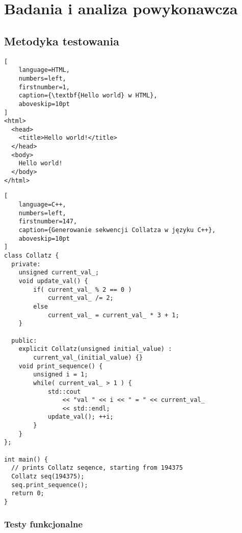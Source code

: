 \part{Badania i analiza powykonawcza}
\noindent \lipsum[1-5]

\clearpage\chapter{Metodyka testowania}
\noindent \lipsum[6-8]

\begin{addmargin}[8mm]{0mm}
\begin{lstlisting}[
    language=HTML,
    numbers=left,
    firstnumber=1,
    caption={\textbf{Hello world} w HTML},
    aboveskip=10pt
]
<html>
  <head>
    <title>Hello world!</title>
  </head>
  <body>
    Hello world!
  </body>
</html>
\end{lstlisting}
\end{addmargin}

\lipsum[9-10]
\begin{addmargin}[12mm]{0mm}
\begin{lstlisting}[
    language=C++,
    numbers=left,
    firstnumber=147,
    caption={Generowanie sekwencji Collatza w języku C++},
    aboveskip=10pt
]
class Collatz {
  private:
    unsigned current_val_;
    void update_val() {
        if( current_val_ % 2 == 0 )
            current_val_ /= 2;
        else
            current_val_ = current_val_ * 3 + 1;
    }

  public:
    explicit Collatz(unsigned initial_value) :
        current_val_(initial_value) {}
    void print_sequence() {
        unsigned i = 1;
        while( current_val_ > 1 ) {
            std::cout
                << "val " << i << " = " << current_val_
                << std::endl;
            update_val(); ++i;
        }
    }
};

int main() {
  // prints Collatz seqence, starting from 194375
  Collatz seq(194375);
  seq.print_sequence();
  return 0;
}
\end{lstlisting}
\end{addmargin}

\lipsum[10-12]
 
    \section{Testy funkcjonalne}
      \noindent\lipsum[1-3]

